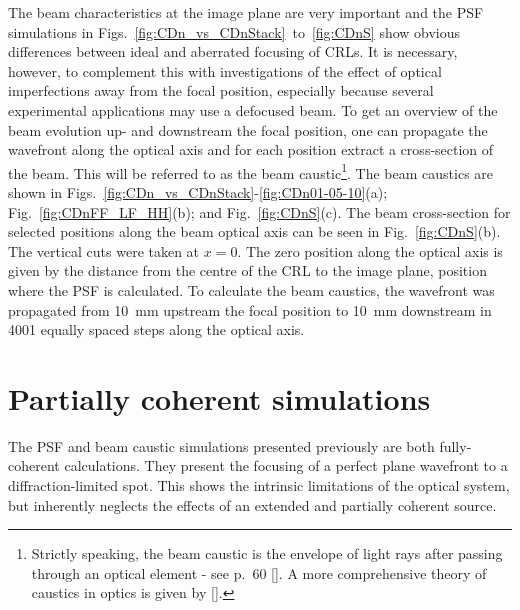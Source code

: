\begin{refsection}
The beam characteristics at the image plane are very important and the PSF simulations in Figs.~\ref{fig:CDn_vs_CDnStack}~to~\ref{fig:CDnS} show obvious differences between ideal and aberrated focusing of CRLs. It is necessary, however, to complement this with investigations of the effect of optical imperfections away from the focal position, especially because several experimental applications may use a defocused beam. To get an overview of the beam evolution up- and downstream the focal position, one can propagate the wavefront along the optical axis and for each position extract a cross-section of the beam. This will be referred to as the beam caustic\footnote{Strictly speaking, the beam caustic is the envelope of light rays after passing through an optical element - see p.~60 [\cite{Lawrence1972}]. A more comprehensive theory of caustics in optics is given by [\cite{Kravstov1999, Nye1999}].}. The beam caustics are shown in Figs.~\ref{fig:CDn_vs_CDnStack}-\ref{fig:CDn01-05-10}(a); Fig.~\ref{fig:CDnFF_LF_HH}(b); and Fig.~\ref{fig:CDnS}(c). The beam cross-section for selected positions along the beam optical axis can be seen in Fig.~\ref{fig:CDnS}(b). The vertical cuts were taken at $x=0$. The zero position along the optical axis is given by the distance from the centre of the CRL to the image plane, position where the PSF is calculated. To calculate the beam caustics, the wavefront was propagated from 10~mm upstream the focal position to 10~mm downstream in 4001 equally spaced steps along the optical axis.

\section{Partially coherent simulations}\label{sec:partcoherent_sim}

The PSF and beam caustic simulations presented previously are both fully-coherent calculations. They present the focusing of a perfect plane wavefront to a diffraction-limited spot. This shows the intrinsic limitations of the optical system, but inherently neglects the effects of an extended and partially coherent source.


\end{refsection}
